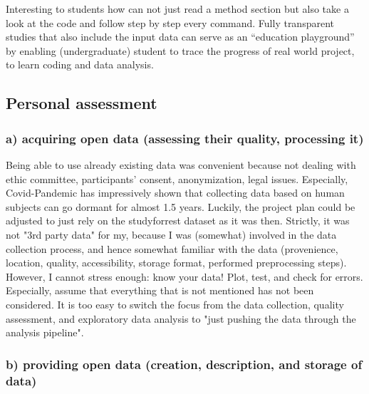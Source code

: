 %
Interesting to students how can not just read a method section but also take a
look at the code and follow step by step every command.
%
Fully transparent studies that also include the input data can serve as an
``education playground'' by enabling (undergraduate) student to trace the
progress of real world project, to learn coding and data analysis.



\subsection{Personal assessment}





\subsubsection{a) acquiring open data (assessing their quality, processing it)}

%
Being able to use already existing data was convenient because not dealing with
ethic committee, participants' consent, anonymization, legal issues.
%
Especially, Covid-Pandemic has impressively shown that collecting data based on
human subjects can go dormant for almost 1.5 years.
%
Luckily, the project plan could be adjusted to just rely on the studyforrest
dataset as it was then.
%
Strictly, it was not "3rd party data" for my, because I was (somewhat) involved
in the data collection process, and hence somewhat familiar with the data
(provenience, location, quality, accessibility, storage format, performed
preprocessing steps).
%
However, I cannot stress enough: know your data! Plot, test, and check for
errors.
%
Especially, assume that everything that is not mentioned has not been
considered.
%
It is too easy to switch the focus from the data collection, quality assessment,
and exploratory data analysis to "just pushing the data through the analysis
pipeline".



\subsubsection{b) providing open data (creation, description, and storage of data)}



